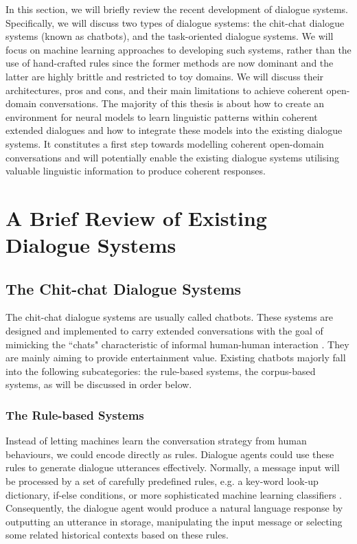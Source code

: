 \documentclass[bsc,frontabs,twoside,singlespacing,parskip,deptreport]{infthesis}     %
\begin{document}
In this section, we will briefly review the recent development of dialogue systems. Specifically, we will discuss two types of dialogue systems: the chit-chat dialogue systems (known as chatbots), and the task-oriented dialogue systems. We will focus on machine learning approaches to developing such systems, rather than the use of hand-crafted rules since the former methods are now dominant and the latter are highly brittle and restricted to toy domains. We will discuss their architectures, pros and cons, and their main limitations to achieve coherent open-domain conversations. The majority of this thesis is about how to create an environment for neural models to learn linguistic patterns within coherent extended dialogues and how to integrate these models into the existing dialogue systems. It constitutes a first step towards modelling coherent open-domain conversations and will potentially enable the existing dialogue systems utilising valuable linguistic information to produce coherent responses.

\section {A Brief Review of Existing Dialogue Systems}

\subsection{The Chit-chat Dialogue Systems}

The chit-chat dialogue systems are usually called chatbots. These systems are designed and implemented to carry extended conversations with the goal of mimicking the ``chats" characteristic of informal human-human interaction \cite{jurafsky2019speech}. They are mainly aiming to provide entertainment value. Existing chatbots majorly fall into the following subcategories: the rule-based systems, the corpus-based systems, as will be discussed in order below.

\subsubsection*{The Rule-based Systems}

Instead of letting machines learn the conversation strategy from human behaviours, we could encode directly as rules. Dialogue agents could use these rules to generate dialogue utterances effectively. Normally, a message input will be processed by a set of carefully predefined rules, e.g. a key-word look-up dictionary, if-else conditions, or more sophisticated machine learning classifiers \cite{jiweilithesis}. Consequently, the dialogue agent would produce a natural language response by outputting an utterance in storage, manipulating the input message or selecting some related historical contexts based on these rules.
\end{document}
